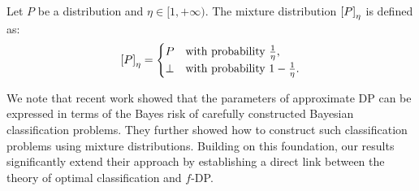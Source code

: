 
\begin{definition}
Let $P$ be a distribution and $\eta \in [1, +\infty)$. The mixture distribution $\left[P\right]_{\eta}$ is defined as:
\begin{align*}
    \left[P\right]_{\eta} =
    \begin{cases} 
        P & \text{with probability } \frac{1}{\eta}, \\
        \bot & \text{with probability } 1 - \frac{1}{\eta}.
    \end{cases}
\end{align*}
\end{definition}

We note that recent work \cite{Lu2024} showed that the parameters of approximate DP can be expressed in terms of the Bayes risk of carefully constructed Bayesian classification problems. They further showed how to construct such classification problems using mixture distributions. Building on this foundation, our results significantly extend their approach by establishing a direct link between the theory of optimal classification and $f$-DP.

